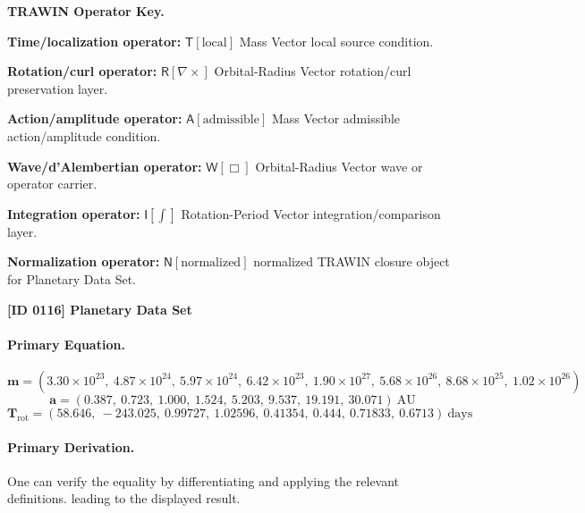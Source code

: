 \par\vspace{0.45\baselineskip}
\noindent\begin{minipage}[t]{\linewidth}
\begingroup
\small
\raggedright
\textbf{TRAWIN Operator Key.}\par
\noindent\textbf{Time/localization operator:} $\mathsf{T}\!\left[\mathrm{local}\right]$ Mass Vector local source condition.\par
\noindent\textbf{Rotation/curl operator:} $\mathsf{R}\!\left[\nabla\times\right]$ Orbital-Radius Vector rotation/curl preservation layer.\par
\noindent\textbf{Action/amplitude operator:} $\mathsf{A}\!\left[\mathrm{admissible}\right]$ Mass Vector admissible action/amplitude condition.\par
\noindent\textbf{Wave/d'Alembertian operator:} $\mathsf{W}\!\left[\Box\right]$ Orbital-Radius Vector wave or operator carrier.\par
\noindent\textbf{Integration operator:} $\mathsf{I}\!\left[\int\right]$ Rotation-Period Vector integration/comparison layer.\par
\noindent\textbf{Normalization operator:} $\mathsf{N}\!\left[\mathrm{normalized}\right]$ normalized TRAWIN closure object for Planetary Data Set.\par
\endgroup
\end{minipage}

\clearpage
\noindent\textbf{[ID 0116] Planetary Data Set}\par
\vspace{0.35em}
\paragraph{Primary Equation.}
\[
\mathbf{m}=
(3.30\times 10^{23},\ 4.87\times 10^{24},\ 5.97\times 10^{24},\ 6.42\times 10^{23},\ 1.90\times 10^{27},\ 5.68\times 10^{26},\ 8.68\times 10^{25},\ 1.02\times 10^{26})
\]
\[
\mathbf{a}=
(0.387,\ 0.723,\ 1.000,\ 1.524,\ 5.203,\ 9.537,\ 19.191,\ 30.071)\ \mathrm{AU}
\]
\[
\mathbf{T}_{\mathrm{rot}}=
(58.646,\ -243.025,\ 0.99727,\ 1.02596,\ 0.41354,\ 0.444,\ 0.71833,\ 0.6713)\ \mathrm{days}
\]

\paragraph{Primary Derivation.}
One can verify the equality by differentiating and applying the relevant definitions. leading to the displayed result.
